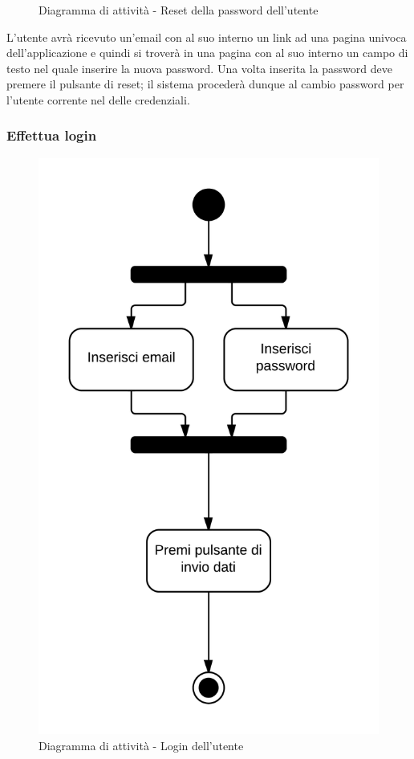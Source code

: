 \begin{figure}[H]
\caption{Diagramma di attività - Reset della password dell'utente}
\end{figure}

L'utente avrà ricevuto un'email con al suo interno un link ad una pagina univoca dell'applicazione  e quindi si troverà in una pagina con al suo interno un campo di testo nel quale inserire la nuova password. Una volta inserita la password deve premere il pulsante di reset; il sistema  procederà dunque al cambio password per l'utente corrente nel  delle credenziali.

\subsubsection{Effettua login}

\begin{figure}[H]
\centering
\includegraphics[scale=0.1]{uml/attivita/MaaP - Effettua login.png}
\caption{Diagramma di attività - Login dell'utente}
\end{figure}

